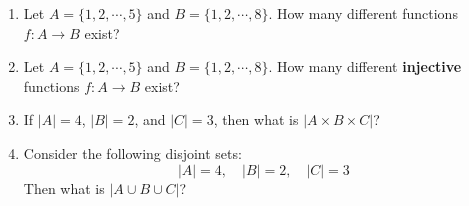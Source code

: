 \begin{enumerate}
\begin{enumerate}[label=\roman*.]
        \item Assign Kitchen duties in one of 20 ways
        \item Paint your house in one of 40 ways
        \item Choose one of 24 ways to get a degree
    \end{enumerate}
    \item 
    Let \( A = \{1, 2, \cdots, 5\} \) and \( B = \{1, 2, \cdots, 8\} \).
    How many different functions \( f : A \to B \) exist?
    \item 
    Let \( A = \{1, 2, \cdots, 5\} \) and \( B = \{1, 2, \cdots, 8\} \).
    How many different \textbf{injective} functions \( f : A \to B \) exist?
    \item 
    If \( |A| = 4 \), \( |B| = 2 \), and \( |C| = 3 \),
    then what is \( |A \times B \times C| \)?
    \item
    Consider the following disjoint sets:
    \[
    |A| = 4, \quad |B| = 2, \quad |C| = 3
    \]
    Then what is \( |A \cup B \cup C| \)?
\end{enumerate}
